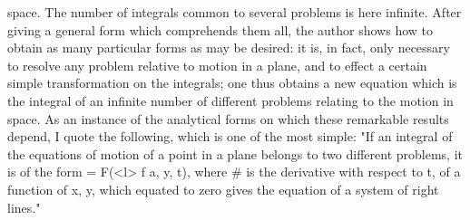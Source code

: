 \documentclass[11pt,a4paper]{book}
\begin{document}
space. The number of integrals common to several problems is here infinite. After
giving a general form which comprehends them all, the author shows how to obtain
as many particular forms as may be desired: it is, in fact, only necessary to resolve
any problem relative to motion in a plane, and to effect a certain simple transformation
on the integrals; one thus obtains a new equation which is the integral of an
infinite number of different problems relating to the motion in space.
As an instance of the analytical forms on which these remarkable results depend,
I quote the following, which is one of the most simple: "If an integral of the
equations of motion of a point in a plane belongs to two different problems, it is of
the form
=
F(<l> f a, y, t),
where # is the derivative with respect to t, of a function of x, y, which equated to
zero gives the equation of a system of right lines."


\end{document}
